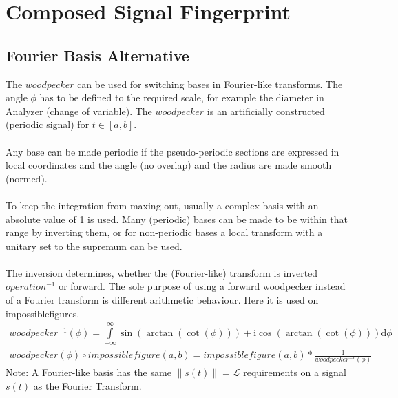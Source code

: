 \documentclass{report}
\newcommand\norm[1]{\left\lVert#1\right\rVert}
\begin{document}
\section{Composed Signal Fingerprint}
\subsection{Fourier Basis Alternative}
The $woodpecker$ can be used for switching bases in Fourier-like transforms. The angle $\phi$ has to be defined to the required scale, for example the diameter in Analyzer (change of variable). The $woodpecker$ is an artificially constructed (periodic signal) for $t \in [a,b]$.\\\\
Any base can be made periodic if the pseudo-periodic sections are expressed in local coordinates and the angle (no overlap) and the radius are made smooth (normed).\\\\
To keep the integration from maxing out, usually a complex basis with an absolute value of 1 is used. Many (periodic) bases can be made to be within that range by inverting them, or for non-periodic bases a local transform with a unitary set to the supremum can be used.\\\\
The inversion determines, whether the (Fourier-like) transform is inverted $operation^{-1}$ or forward. The sole purpose of using a forward woodpecker instead of a Fourier transform is different arithmetic behaviour. Here it is used on impossiblefigures.
\begin{align}
woodpecker^{-1}(\phi)=\int \limits _{-\infty}^{\infty}\sin(\arctan(\cot(\phi))) + \mathrm{i} \cos(\arctan(\cot(\phi)))\mathrm{d}\phi\\
woodpecker(\phi) \circ impossiblefigure(a,b)=impossiblefigure(a,b)*\frac{1}{woodpecker^{-1}(\phi)}
\end{align}
Note: A Fourier-like basis has the same $\norm{s(t)}=\mathcal{L}$ requirements on a signal $s(t)$ as the Fourier Transform.
\end{document}

